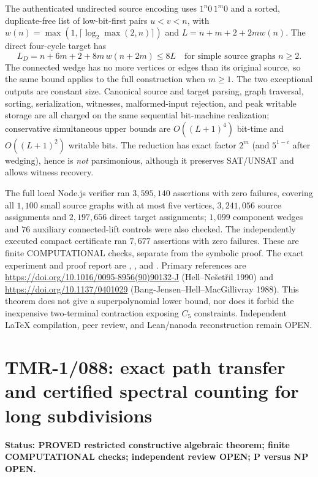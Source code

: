 \documentclass[11pt]{article}
\begin{document}
The authenticated undirected source encoding uses
$1^n0\,1^m0$ and a sorted, duplicate-free list of
low-bit-first pairs $u<v<n$, with
$w(n)=\max(1,\lceil\log_2\max(2,n)\rceil)$ and
$L=n+m+2+2mw(n)$. The direct four-cycle target has
\[
L_D=n+6m+2+8m\,w(n+2m)\le8L
\quad\text{for simple source graphs }n\ge2.
\]
The connected wedge has no more vertices or edges
than its original source, so the same bound applies
to the full construction when $m\ge1$.
The two exceptional outputs are constant size.
Canonical source and target parsing, graph traversal,
sorting, serialization, witnesses, malformed-input
rejection, and peak writable storage are all charged
on the same sequential bit-machine realization;
conservative simultaneous upper bounds are
$O((L+1)^4)$ bit-time and $O((L+1)^2)$ writable bits.
The reduction has exact factor $2^m$ (and
$5^{1-c}$ after wedging), hence is \emph{not}
parsimonious, although it preserves SAT/UNSAT
and allows witness recovery.

The full local Node.js verifier ran $3{,}595{,}140$
assertions with zero failures, covering all
$1{,}100$ small source graphs with at most five
vertices, $3{,}241{,}056$ source assignments and
$2{,}197{,}656$ direct target assignments;
$1{,}099$ component wedges and $76$ auxiliary
connected-lift controls were also checked.
The independently executed compact certificate
ran $7{,}677$ assertions with zero failures.
These are finite COMPUTATIONAL checks, separate
from the symbolic proof.
The exact experiment and proof report are
,
,
and
.
Primary references are
\url{https://doi.org/10.1016/0095-8956(90)90132-J}
(Hell--Ne\v{s}et\v{r}il 1990) and
\url{https://doi.org/10.1137/0401029}
(Bang-Jensen--Hell--MacGillivray 1988).
This theorem does not give a superpolynomial
lower bound, nor does it forbid the inexpensive
two-terminal contraction exposing $C_5$ constraints.
Independent LaTeX compilation, peer review,
and Lean/nanoda reconstruction remain OPEN.



\section{TMR-1/088: exact path transfer and certified spectral counting for long subdivisions}
\noindent\textbf{Status: PROVED restricted constructive algebraic theorem;
finite COMPUTATIONAL checks; independent review OPEN; P versus NP OPEN.}
\end{document}
